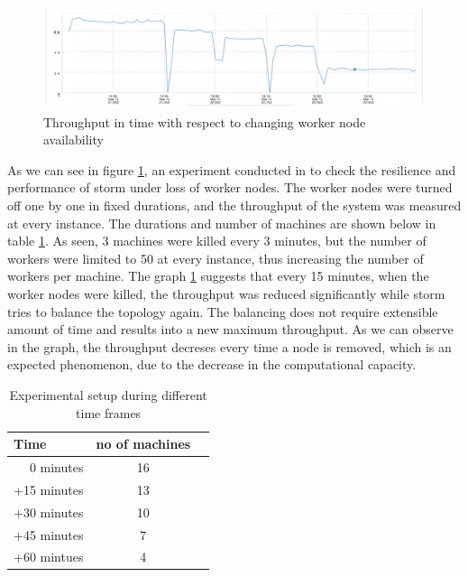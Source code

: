 \documentclass[runningheads,a4paper]{llncs}[2015/06/24]
\begin{document}
\begin{figure}
  \begin{center}
    \includegraphics[width=\textwidth, height=0.25\textheight]{throughput.png}
    \caption{Throughput in time with respect to changing worker node availability \cite{stormtwitter}}
    \label{fig:throughput}
   \end{center}
\end{figure}

As we can see in figure \ref{fig:throughput}, an experiment conducted in \cite{stormtwitter} to check the resilience and performance of storm under loss of worker nodes. The worker nodes were turned off one by one in fixed durations, and the throughput of the system was measured at every instance. The durations and number of machines are shown below in table \ref{tab:experiment}. As seen, 3 machines were killed every 3 minutes, but the number of workers were limited to 50 at every instance, thus increasing the number of workers per machine. The graph \ref{fig:throughput} suggests that every 15 minutes, when the worker nodes were killed, the throughput was reduced significantly while storm tries to balance the topology again. The balancing does not require extensible amount of time and results into a new maximum throughput. As we can observe in the graph, the throughput decreses every time a node is removed, which is an expected phenomenon, due to the decrease in the computational capacity.

\begin{table}
\caption{Experimental setup during different time frames}
\label{tab:experiment}
\begin{center}
\begin{tabular}{r@{\quad}cl}
\hline
\multicolumn{1}{l}{\rule{0pt}{12pt} 
	Time}&\multicolumn{1}{l}{no of machines}\\[2pt]
\hline\rule{0pt}{12pt}
0 minutes  & 16  \\
+15 minutes & 13 \\
+30 minutes & 10 \\
+45 minutes & 7 \\
+60 mintues & 4 \\[2pt]
\hline
\end{tabular}
\end{center}
\end{table}
\end{document}
